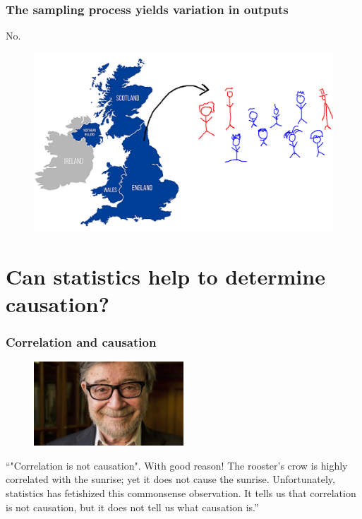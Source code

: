 \documentclass[handout]{beamer}
\begin{document}
\begin{frame}
	\frametitle{The sampling process yields variation in outputs}
	No.
	
	\begin{figure}[ht]
		\centerline{\includegraphics[width=1\textwidth]{../figures/uk-population.pdf}}
	\end{figure}
	
\end{frame}

\section{Can statistics help to determine causation?}
\frame{\tableofcontents[currentsection]}


\begin{frame}
	\frametitle{Correlation and causation}
	
	\begin{figure}[ht]
		\centerline{\includegraphics[width=0.5\textwidth]{../figures/judea_pearl.jpeg}}
	\end{figure}
	
	``"Correlation is not causation". With good reason! The rooster's crow is highly correlated with the sunrise; yet it does not cause the sunrise. Unfortunately, statistics has fetishized this commonsense observation. It tells us that correlation is not causation, but it does not tell us what causation is.''
	
\end{frame}
\end{document}
